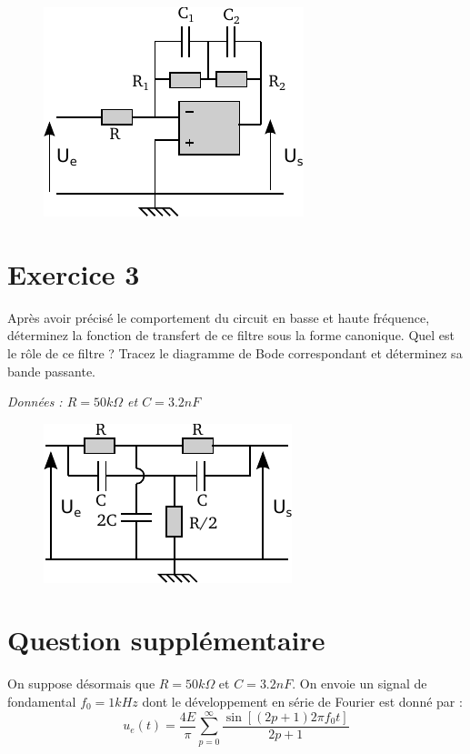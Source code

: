 \documentclass{report}
\begin{document}
\begin{figure}[!h]
\centering
\includegraphics[width=0.5\linewidth]{circuit_6.pdf}
\end{figure}

 \newpage

\section*{Exercice 3}

Après avoir précisé le comportement du circuit en basse et haute fréquence, déterminez la fonction de transfert de ce filtre sous la forme canonique. Quel est le rôle de ce filtre ? Tracez le diagramme de Bode correspondant et déterminez sa bande passante. 

\textit{Données : $R=50k\Omega$ et $C=3.2nF$}

\begin{figure}[!h]
\centering
\includegraphics[width=0.5\linewidth]{circuit_2.pdf}
\end{figure}

\section*{Question supplémentaire}
On suppose désormais que $R=50k\Omega$ et $C=3.2nF$. On envoie un signal de fondamental $f_{0}=1kHz$ dont le développement en série de Fourier est donné par :
\begin{equation}
u_{e}(t)=\frac{4E}{\pi}\sum_{p=0}^{\infty}\frac{\sin \left[    \left( 2p+1\right)2\pi f_{0}t \right]}{2p+1}  
\end{equation}
\end{document}
